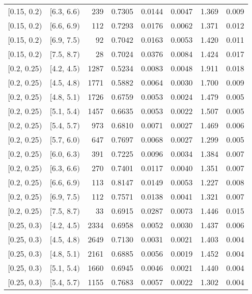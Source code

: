 \begin{longtable}{| l | l | r | r | r | r | r | r |}
        $[$0.15, 0.2$)$ & $[$6.3, 6.6$)$ & 239 & 0.7305 & 0.0144 & 0.0047 & 1.369 & 0.009 \\
        $[$0.15, 0.2$)$ & $[$6.6, 6.9$)$ & 112 & 0.7293 & 0.0176 & 0.0062 & 1.371 & 0.012 \\
        $[$0.15, 0.2$)$ & $[$6.9, 7.5$)$ & 92 & 0.7042 & 0.0163 & 0.0053 & 1.420 & 0.011 \\
        $[$0.15, 0.2$)$ & $[$7.5, 8.7$)$ & 28 & 0.7024 & 0.0376 & 0.0084 & 1.424 & 0.017 \\
        $[$0.2, 0.25$)$ & $[$4.2, 4.5$)$ & 1287 & 0.5234 & 0.0083 & 0.0048 & 1.911 & 0.018 \\
        $[$0.2, 0.25$)$ & $[$4.5, 4.8$)$ & 1771 & 0.5882 & 0.0064 & 0.0030 & 1.700 & 0.009 \\
        $[$0.2, 0.25$)$ & $[$4.8, 5.1$)$ & 1726 & 0.6759 & 0.0053 & 0.0024 & 1.479 & 0.005 \\
        $[$0.2, 0.25$)$ & $[$5.1, 5.4$)$ & 1457 & 0.6635 & 0.0053 & 0.0022 & 1.507 & 0.005 \\
        $[$0.2, 0.25$)$ & $[$5.4, 5.7$)$ & 973 & 0.6810 & 0.0071 & 0.0027 & 1.469 & 0.006 \\
        $[$0.2, 0.25$)$ & $[$5.7, 6.0$)$ & 647 & 0.7697 & 0.0068 & 0.0027 & 1.299 & 0.005 \\
        $[$0.2, 0.25$)$ & $[$6.0, 6.3$)$ & 391 & 0.7225 & 0.0096 & 0.0034 & 1.384 & 0.007 \\
        $[$0.2, 0.25$)$ & $[$6.3, 6.6$)$ & 270 & 0.7401 & 0.0117 & 0.0040 & 1.351 & 0.007 \\
        $[$0.2, 0.25$)$ & $[$6.6, 6.9$)$ & 113 & 0.8147 & 0.0149 & 0.0053 & 1.227 & 0.008 \\
        $[$0.2, 0.25$)$ & $[$6.9, 7.5$)$ & 112 & 0.7571 & 0.0138 & 0.0041 & 1.321 & 0.007 \\
        $[$0.2, 0.25$)$ & $[$7.5, 8.7$)$ & 33 & 0.6915 & 0.0287 & 0.0073 & 1.446 & 0.015 \\
        $[$0.25, 0.3$)$ & $[$4.2, 4.5$)$ & 2334 & 0.6958 & 0.0052 & 0.0030 & 1.437 & 0.006 \\
        $[$0.25, 0.3$)$ & $[$4.5, 4.8$)$ & 2649 & 0.7130 & 0.0031 & 0.0021 & 1.403 & 0.004 \\
        $[$0.25, 0.3$)$ & $[$4.8, 5.1$)$ & 2161 & 0.6885 & 0.0056 & 0.0019 & 1.452 & 0.004 \\
        $[$0.25, 0.3$)$ & $[$5.1, 5.4$)$ & 1660 & 0.6945 & 0.0046 & 0.0021 & 1.440 & 0.004 \\
        $[$0.25, 0.3$)$ & $[$5.4, 5.7$)$ & 1155 & 0.7683 & 0.0057 & 0.0022 & 1.302 & 0.004 \\

\end{longtable}
